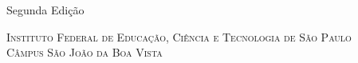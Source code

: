 {
    \thispagestyle{empty}
    
    \center
    
    \vspace*{4.5cm}
    \noindent
    \chaptitlefont\HUGE\textsc{\thetitle}
    
    {\normalsize Segunda Edição}
    
    \vspace{4.5cm}
    \noindent
    \chaptitlefont\Large\textsc{\theauthor}
    
    \chaptitlefont\tiny\textsc{Instituto Federal de Educação, Ciência e Tecnologia de São Paulo}\\
    \chaptitlefont\tiny\textsc{Câmpus São João da Boa Vista}
        
    \vfill
    \restoregeometry
}